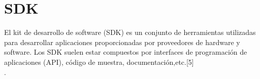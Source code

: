 \section{SDK}
El kit de desarrollo de software (SDK) es un conjunto de herramientas utilizadas para desarrollar aplicaciones proporcionadas por proveedores de hardware y software. Los SDK suelen estar compuestos por interfaces de programación de aplicaciones (API), código de muestra, documentación,etc.[5] \\.\par 
